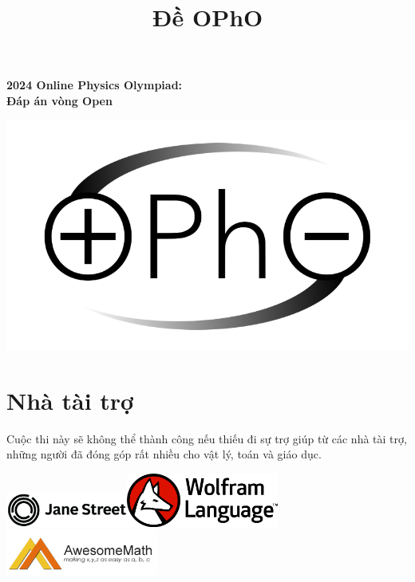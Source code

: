 \documentclass[11pt]{article}
\title{Đề OPhO}
\begin{document}
\begin{titlepage}
    \begin{center}
        
        \Huge
        \textbf{2024 Online Physics Olympiad: \\
        Đáp án vòng Open}
        
        \vspace{0.5cm}
        
        \begin{center}
            \includegraphics[width=0.6\linewidth]{OPhO Logo, White BKGD.png}
        \end{center}
        \end{center}


\section*{Nhà tài trợ}

\vspace{-0.5cm}

Cuộc thi này sẽ không thể thành công nếu thiếu đi sự trợ giúp từ các nhà tài trợ, những người đã đóng góp rất nhiều cho vật lý, toán và giáo dục.
\begin{center}
    \includegraphics[width = 4cm]{sponsors/jane-street.png}\qquad\includegraphics[width = 5cm]{sponsors/wolfram.png}\qquad\includegraphics[width = 5cm]{sponsors/awesome-math.png}\\ 
    

\end{center}
\end{titlepage}
\end{document}
